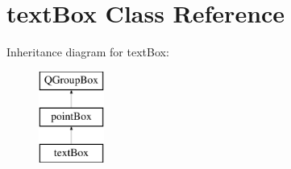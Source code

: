 \hypertarget{classtextBox}{\section{text\-Box Class Reference}
\label{classtextBox}
}
Inheritance diagram for text\-Box\-:\begin{figure}[H]
\begin{center}
\leavevmode
\includegraphics[height=3.000000cm]{classtextBox}
\end{center}
\end{figure}
